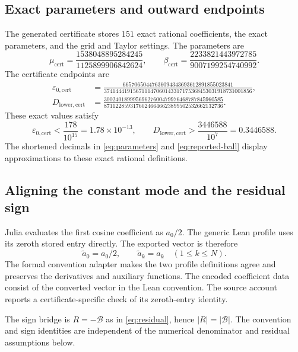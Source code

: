 \documentclass[11pt]{article}
\numberwithin{equation}{section}
\begin{document}
\subsection{Exact parameters and outward endpoints}

The generated certificate stores $151$ exact rational coefficients,
the exact parameters, and the grid and Taylor settings. The parameters are
\begin{equation}
 \mu_{\mathrm{cert}}=\frac{1538048895284245}{1125899906842624},\qquad
 \beta_{\mathrm{cert}}=\frac{2233821443972785}{9007199254740992}.
 \label{eq:exact-parameters}
\end{equation}
The certificate endpoints are
\begin{align}
 \varepsilon_{0,\mathrm{cert}}
 &=\frac{66570650447636094343693612891855023841}
 {374144419156711147060143317175368453031918731001856},
 \label{eq:exact-epsilon}\\
 D_{\mathrm{lower,cert}}
 &=\frac{30024018999569627600479976468787845960585}
 {87112285931760246646623899502532662132736}.
 \label{eq:exact-D}
\end{align}
These exact values satisfy
\begin{equation}
 \varepsilon_{0,\mathrm{cert}}<\frac{178}{10^{15}}
 =1.78\times10^{-13},\qquad
 D_{\mathrm{lower,cert}}>\frac{3446588}{10^7}=0.3446588.
 \label{eq:rational-comparisons}
\end{equation}
The shortened decimals in \eqref{eq:parameters} and
\eqref{eq:reported-ball} display approximations to these exact rational
definitions.

\subsection{Aligning the constant mode and the residual sign}

Julia evaluates the first cosine coefficient as $a_0/2$. The generic Lean
profile uses its zeroth stored entry directly. The exported vector is
therefore
\begin{equation}
 \widetilde a_0=a_0/2,\qquad\widetilde a_k=a_k\quad(1\leq k\leq N).
 \label{eq:half-DC}
\end{equation}
The formal convention adapter makes the two profile definitions agree and
preserves the derivatives and auxiliary functions. The encoded coefficient
data consist of the converted vector in the Lean convention. The source
account reports a certificate-specific check of its zeroth-entry identity.

The sign bridge is $R=-\mathcal B$ as in \eqref{eq:residual}, hence
$|R|=|\mathcal B|$. The convention and sign identities are independent of
the numerical denominator and residual assumptions below.
\end{document}
